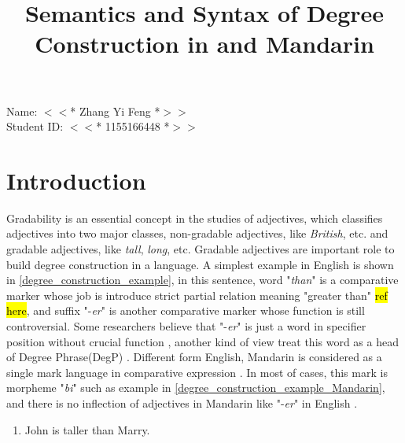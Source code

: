 \documentclass{ctexart}
\title{Semantics and Syntax of Degree Construction in and Mandarin}
\date{\vspace{-10ex}}
\let \cite \parencite
\begin{document}
\thispagestyle{empty} %

\begin{center}

Name: $<<$* Zhang Yi Feng *$>>$ \\
Student ID: $<<$* 1155166448 *$>>$

\end{center}

{\let\newpage\relax\maketitle}


\section{Introduction}

\setcounter{page}{1}

Gradability is an essential concept in the studies of adjectives, which classifies adjectives into two major classes, non-gradable adjectives, like \textit{British}, etc. and gradable adjectives, like \textit{tall}, \textit{long}, etc. Gradable adjectives are important role to build degree construction in a language. A simplest example in English is shown in \ref{degree_construction_example}, in this sentence, word "\textit{than}" is a comparative marker whose job is introduce strict partial relation meaning "greater than" \hl{ref here}, and suffix "-\textit{er}" is another comparative marker whose function is still controversial. Some researchers believe that "-\textit{er}" is just a word in specifier position without crucial function \cite{rullmann1995,von1984a,heim1985,bhatt2004}, another kind of view treat this word as a head of Degree Phrase(DegP) \cite{corver1990,kennedy1997,grano2012}. Different form English, Mandarin is considered as a single mark language in comparative expression \cite{bobaljik2012,grano2012}. In most of cases, this mark is morpheme "\textit{bi}" such as example in \ref{degree_construction_example_Mandarin}, and there is no inflection of adjectives in Mandarin like "-\textit{er}" in English \cite{guo2012}. 

\begin{enumerate}
    \item \label{degree_construction_example}
    John is taller than Marry.
\end{enumerate}
\end{document}
